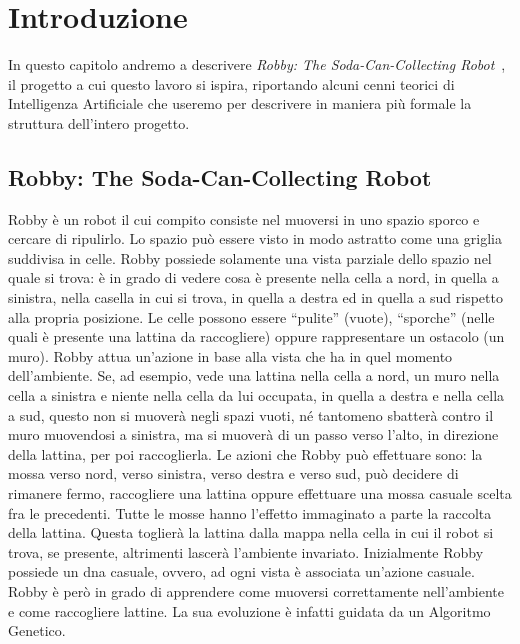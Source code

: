 \chapter{Introduzione}
In questo capitolo andremo a descrivere \textit{Robby: The Soda-Can-Collecting
Robot}~\cite{biblio:robby}, il progetto a cui questo lavoro si ispira,
riportando alcuni cenni teorici di Intelligenza Artificiale che useremo per
descrivere in maniera più formale la struttura dell'intero progetto.

\section{Robby: The Soda-Can-Collecting Robot}
Robby è un robot il cui compito consiste nel muoversi in uno spazio sporco e
cercare di ripulirlo. Lo spazio può essere visto in modo astratto come una
griglia suddivisa in celle. Robby possiede solamente una vista parziale dello
spazio nel quale si trova: è in grado di vedere cosa è presente nella cella a
nord, in quella a sinistra, nella casella in cui si trova, in quella a destra ed
in quella a sud rispetto alla propria posizione. Le celle possono essere
``pulite'' (vuote), ``sporche'' (nelle quali è presente una lattina da
raccogliere) oppure rappresentare un ostacolo (un muro).\newline
Robby attua un'azione in base alla vista che ha in quel momento dell'ambiente.
Se, ad esempio, vede una lattina nella cella a nord, un muro nella cella a
sinistra e niente nella cella da lui occupata, in quella a destra e nella cella
a sud, questo non si muoverà negli spazi vuoti, né tantomeno sbatterà contro il
muro muovendosi a sinistra, ma si muoverà di un passo verso l'alto, in direzione
della lattina, per poi raccoglierla. Le azioni che Robby può effettuare sono: la
mossa verso nord, verso sinistra, verso destra e verso sud, può decidere di
rimanere fermo, raccogliere una lattina oppure effettuare una mossa casuale
scelta fra le precedenti. Tutte le mosse hanno l'effetto immaginato a parte la
raccolta della lattina. Questa toglierà la lattina dalla mappa nella cella in
cui il robot si trova, se presente, altrimenti lascerà l'ambiente
invariato.\newline
Inizialmente Robby possiede un dna casuale, ovvero, ad ogni vista è associata
un'azione casuale. Robby è però in grado di apprendere come muoversi
correttamente nell'ambiente e come raccogliere lattine. La sua evoluzione è
infatti guidata da un Algoritmo Genetico.

